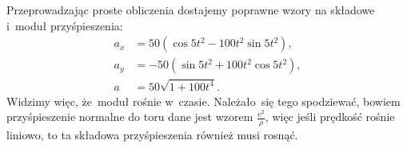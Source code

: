\documentclass[a4paper,11pt]{article}
\newcommand{\fr}{\frac}
\newcommand{\sq}{\sqrt}
\begin{document}
Przeprowadzając proste obliczenia dostajemy poprawne wzory na składowe
i~moduł przyśpieszenia:
\begin{align*}
  a_{ x } &= 50 ( \cos 5t^{ 2 } - 100 t^{ 2 } \sin 5t^{ 2 } ), \\
  a_{ y } &= -50 ( \sin 5t^{ 2 } + 100 t^{ 2 } \cos 5t^{ 2 } ), \\
  a &= 50 \sq{ 1 + 100 t^{ 4 } }.
\end{align*}
Widzimy więc, że~moduł rośnie w~czasie. Należało~się tego spodziewać,
bowiem przyśpieszenie normalne do toru dane jest wzorem
$\fr{ v^{ 2 } }{ \rho }$, więc jeśli prędkość rośnie liniowo, to ta
składowa przyśpieszenia również musi rosnąć.

\end{document}

